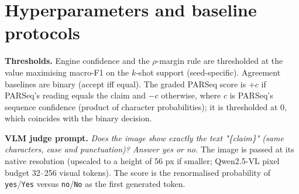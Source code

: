\section{Hyperparameters and baseline protocols}
\label{app:hparams}
\begin{table}[htbp]\centering\caption{Hyperparameters (identical for all datasets and all $k$).}
\scriptsize{}\end{table}

\textbf{Thresholds.} Engine confidence and the $\rho$-margin rule are thresholded at the value
maximising macro-F1 on the $k$-shot support (seed-specific). Agreement baselines are binary
(accept iff equal). The graded PARSeq score is $+c$ if PARSeq's reading equals the claim and $-c$
otherwise, where $c$ is PARSeq's sequence confidence (product of character probabilities); it is
thresholded at 0, which coincides with the binary decision.

\textbf{VLM judge prompt.} \emph{Does the image show exactly the text "\{claim\}" (same characters,
case and punctuation)? Answer yes or no.} The image is passed at its native resolution (upscaled to a
height of 56 px if smaller; Qwen2.5-VL pixel budget 32--256 visual tokens). The score is the
renormalised probability of \texttt{yes}/\texttt{Yes} versus \texttt{no}/\texttt{No} as the first
generated token.

